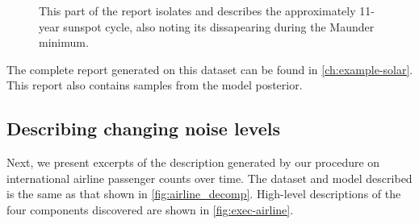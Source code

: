 \begin{figure}[ht!]
\centering
{}
\caption[Automatic description of solar cycle]
{
This part of the report isolates and describes the approximately 11-year sunspot cycle, also noting its dissapearing during the Maunder minimum.}
\label{fig:periodic}
\end{figure}
%
The complete report generated on this dataset can be found in \cref{ch:example-solar}.
This report also contains samples from the model posterior.



\subsection{Describing changing noise levels} %
\label{sec:airline}


Next, we present excerpts of the description generated by our procedure on international airline passenger counts over time. %
The dataset and model described is the same as that shown in \cref{fig:airline_decomp}.
%
High-level descriptions of the four components discovered are shown in \cref{fig:exec-airline}.

